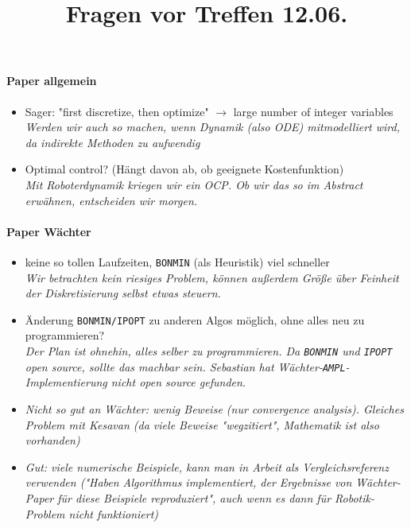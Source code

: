 \documentclass{article}
\title{\textbf{Fragen vor Treffen 12.06.}}
\date{}
\begin{document}
\maketitle
\paragraph{Paper allgemein}
\begin{itemize}
\item Sager: "first discretize, then optimize" $\rightarrow$ large number of integer variables\\
\textit{Werden wir auch so machen, wenn Dynamik (also ODE) mitmodelliert wird, da indirekte Methoden zu aufwendig}
\item Optimal control? (H\"angt davon ab, ob geeignete Kostenfunktion)\\
\textit{Mit Roboterdynamik kriegen wir ein OCP. Ob wir das so im Abstract erwähnen, entscheiden wir morgen.}
\end{itemize}

\paragraph{Paper W\"achter}
\begin{itemize}
\item keine so tollen Laufzeiten, \texttt{BONMIN} (als Heuristik) viel schneller\\
\textit{Wir betrachten kein riesiges Problem, können außerdem Größe über Feinheit der Diskretisierung selbst etwas steuern.}
\item \"Anderung \texttt{BONMIN/IPOPT} zu anderen Algos m\"oglich, ohne alles neu zu programmieren?\\
\textit{Der Plan ist ohnehin, alles selber zu programmieren. Da \texttt{BONMIN} und \texttt{IPOPT} open source, sollte das machbar sein. Sebastian hat W\"achter-\texttt{AMPL}-Implementierung nicht open source gefunden.}
\item \textit{Nicht so gut an W\"achter: wenig Beweise (nur convergence analysis). Gleiches Problem mit Kesavan (da viele Beweise "wegzitiert", Mathematik ist also vorhanden)}
\item \textit{Gut: viele numerische Beispiele, kann man in Arbeit als Vergleichsreferenz verwenden ("Haben Algorithmus implementiert, der Ergebnisse von W\"achter-Paper f\"ur diese Beispiele reproduziert", auch wenn es dann f\"ur Robotik-Problem nicht funktioniert)}
\end{itemize}
\end{document}

